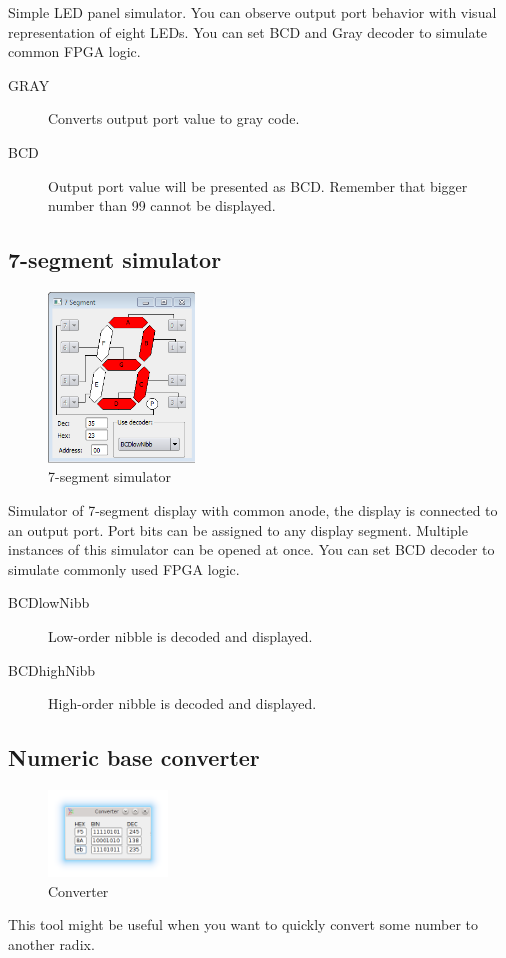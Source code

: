         Simple LED panel simulator. You can observe output port behavior with visual representation of eight LEDs. You can
        set BCD and Gray decoder to simulate common FPGA logic.

        \begin{description}
            \item[GRAY] Converts output port value to gray code.
            \item[BCD] Output port value will be presented as BCD. Remember that bigger number than 99 cannot be displayed.
        \end{description}

    \subsection{7-segment simulator}
        \begin{figure}
            \centering
            \includegraphics[width=110pt]{img/7seg_sim.png}
            \caption{7-segment simulator}
        \end{figure}
        Simulator of 7-segment display with common anode, the display is connected to an output port. Port bits can be
        assigned to any display segment. Multiple instances of this simulator can be opened at once. You can set BCD decoder
        to simulate commonly used FPGA logic.

        \begin{description}
            \item[BCDlowNibb] Low-order nibble is decoded and displayed.
            \item[BCDhighNibb] High-order nibble is decoded and displayed.
        \end{description}

    \subsection{Numeric base converter}
        \begin{figure}
                \centering
                \includegraphics[width=90pt]{img/converter.png}
                \caption{Converter}
        \end{figure}
        This tool might be useful when you want to quickly convert some number to another radix.
